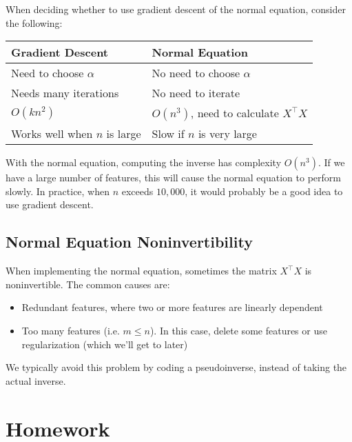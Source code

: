 When deciding whether to use gradient descent of the normal equation, consider the following:

\begin{tabular}{| l | l |} \hline
\textbf{Gradient Descent} & \textbf{Normal Equation} \\
\hline \hline
Need to choose $\alpha$ & No need to choose $\alpha$ \\ \hline
Needs many iterations & No need to iterate \\ \hline
$O\left( kn^2 \right)$ & $O\left(n^3\right)$, need to calculate $X^\intercal X$ \\ \hline
Works well when $n$ is large & Slow if $n$ is very large \\ \hline
\end{tabular}

With the normal equation, computing the inverse has complexity $O\left( n^3 \right)$. If we have a large number of features, this will cause the normal equation to perform slowly. In practice, when $n$ exceeds $10,000$, it would probably be a good idea to use gradient descent. 

\subsection{Normal Equation Noninvertibility}
When implementing the normal equation, sometimes the matrix $X^\intercal X$ is noninvertible. The common causes are:
\begin{itemize}
\item Redundant features, where two or more features are linearly dependent
\item Too many features (i.e. $m \leq n$). In this case, delete some features or use regularization (which we'll get to later)
\end{itemize}

We typically avoid this problem by coding a pseudoinverse, instead of taking the actual inverse. 

\section{Homework}






















